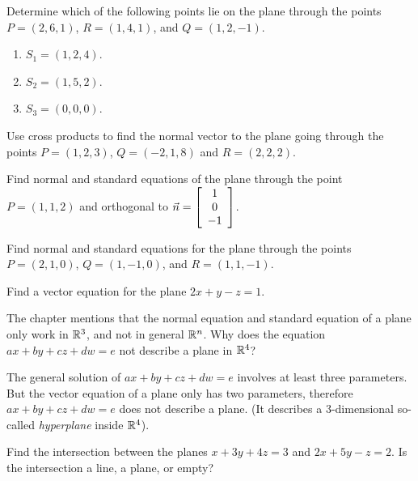 \documentclass{ximera}
\begin{document}
\begin{exercise}
  Determine which of the following points lie on the plane through the
  points $P = (2,6,1)$, $R = (1,4,1)$, and $Q = (1,2,-1)$.
  \begin{enumerate}
  \item $S_1=(1,2,4)$.
  \item $S_2=(1,5,2)$.
  \item $S_3=(0,0,0)$.
  \end{enumerate}
\end{exercise}

\begin{exercise}
  Use cross products to find the normal vector to the plane going
  through the points $P=(1,2,3)$, $Q=(-2,1,8)$ and $R=(2,2,2)$.
\end{exercise}

\begin{exercise}
  Find normal and standard equations of the plane through the
  point $P=(1,1,2)$ and orthogonal to $\vect{n}=\startmat{c} 1 \\ 0 \\ -1 \stopmat$.
\end{exercise}

\begin{exercise}
  Find normal and standard equations for the plane through the points
  $P = (2,1,0)$, $Q=(1,-1,0)$, and $R=(1,1,-1)$.
\end{exercise}

\begin{exercise}
  Find a vector equation for the plane $2x+y-z=1$.
\end{exercise}

\begin{exercise}
  The chapter mentions that the normal equation and standard equation
  of a plane only work in $\R^3$, and not in general $\R^n$. Why does
  the equation $ax+by+cz+dw=e$ not describe a plane in $\R^4$?
  \begin{solution}
    The general solution of $ax+by+cz+dw=e$ involves at least three
    parameters.  But the vector equation of a plane only has two
    parameters, therefore $ax+by+cz+dw=e$ does not describe a
    plane. (It describes a $3$-dimensional so-called {\em
      hyperplane}%
     inside
    $\R^4$).
  \end{solution}
\end{exercise}

\begin{exercise}
  Find the intersection between the planes $x+3y+4z=3$ and $2x+5y-z=2$.
  Is the intersection a line, a plane, or empty?
\end{exercise}
\end{document}
